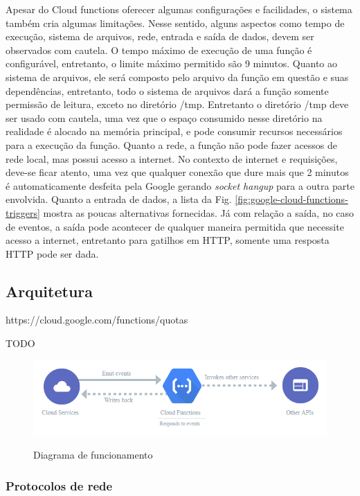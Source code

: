 Apesar do Cloud functions oferecer algumas configurações e facilidades, o
sistema também cria algumas limitações. Nesse sentido, alguns aspectos como
tempo de execução, sistema de arquivos, rede, entrada e saída de dados, devem
ser observados com cautela. O tempo máximo de execução de uma função é
configurável, entretanto, o limite máximo permitido são 9 minutos. Quanto ao
sistema de arquivos, ele será composto pelo arquivo da função em questão e suas
dependências, entretanto, todo o sistema de arquivos dará a função somente
permissão de leitura, exceto no diretório /tmp. Entretanto o diretório /tmp
deve ser usado com cautela, uma vez que o espaço consumido nesse diretório na
realidade é alocado na memória principal, e pode consumir recursos necessários
para a execução da função. Quanto a rede, a função não pode fazer acessos de
rede local, mas possui acesso a internet. No contexto de internet e
requisições, deve-se ficar atento, uma vez que qualquer conexão que dure mais
que 2 minutos é automaticamente desfeita pela Google gerando \textit{socket
	hangup} para a outra parte envolvida. Quanto a entrada de dados, a
lista da
Fig. \ref{fig:google-cloud-functions-triggers} mostra as poucas alternativas
fornecidas. Já com relação a saída, no caso de eventos, a saída pode acontecer
de qualquer maneira permitida que necessite acesso a internet, entretanto para
gatilhos em HTTP, somente uma resposta HTTP pode ser dada.

\subsection{Arquitetura}

https://cloud.google.com/functions/quotas

TODO
\begin{figure}[ht]
	\centering
	\caption{Diagrama de funcionamento}

	\includegraphics[width=12.5cm]{figuras/google-cloud-functions/workflow.png}
	\label{fig:google-cloud-functions-workflow}
\end{figure}

\subsubsection{Protocolos de rede}

